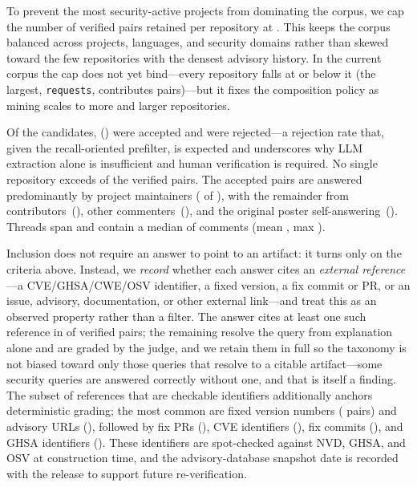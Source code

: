To prevent the most security-active projects from dominating the corpus, we cap
the number of verified pairs retained per repository at . This keeps the
corpus balanced across projects, languages, and security domains rather than
skewed toward the few repositories with the densest advisory history. In the
current corpus the cap does not yet bind---every repository falls at or below it
(the largest, \texttt{requests}, contributes  pairs)---but it fixes the
composition policy as mining scales to more and larger repositories.

Of the  candidates,  () were accepted and
 were rejected---a rejection rate that, given the recall-oriented
prefilter, is expected and underscores why LLM extraction alone is insufficient
and human verification is required.  No single repository exceeds  of
the verified pairs. The accepted pairs are answered predominantly by project
maintainers ( of ), with the remainder from
contributors~(), other commenters~(), and the original poster
self-answering~(). Threads span  and contain a median
of  comments (mean , max ).

Inclusion does not require an answer to point to an artifact: it turns only on
the criteria above. Instead, we \emph{record} whether each answer cites an
\emph{external reference}---a CVE/GHSA/CWE/OSV identifier, a fixed version, a fix
commit or PR, or an issue, advisory, documentation, or other external link---and
treat this as an observed property rather than a filter. The answer cites at least
one such reference in  of verified pairs; the remaining 
resolve the query from explanation alone and are graded by the judge, and we
retain them in full so the taxonomy is not biased toward only those queries that
resolve to a citable artifact---some security queries are answered correctly
without one, and that is itself a finding. The
subset of references that are checkable identifiers additionally anchors
deterministic grading; the most common are fixed version numbers ( pairs)
and advisory URLs (), followed by fix PRs (), CVE identifiers
(), fix commits (), and GHSA identifiers (). These
identifiers are spot-checked against NVD, GHSA, and OSV at construction time, and
the advisory-database snapshot date is recorded with the release to support future
re-verification.

